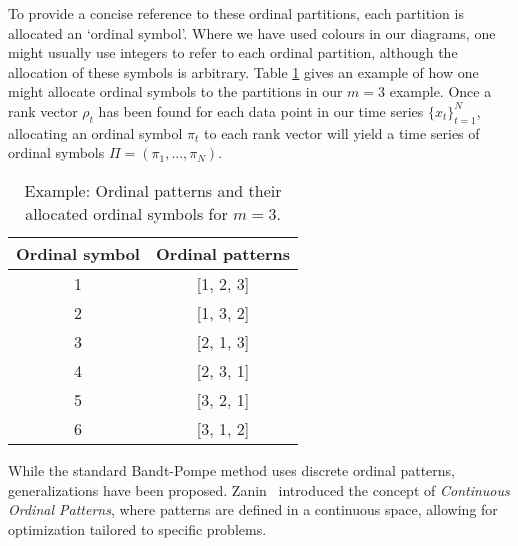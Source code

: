 To provide a concise reference to these ordinal partitions, each partition is allocated an `ordinal symbol'. Where we have used colours in our diagrams, one might usually use integers to refer to each ordinal partition, although the allocation of these symbols is arbitrary. Table \ref{tab:ordinal_symbols} gives an example of how one might allocate ordinal symbols to the partitions in our $m=3$ example. Once a rank vector $\rho_t$ has been found for each data point in our time series $\{x_t\}_{t=1}^N$, allocating an ordinal symbol $\pi_t$ to each rank vector will yield a time series of ordinal symbols $\Pi = (\pi_1,...,\pi_N)$.

\begin{table}[h]
    \centering
    \begin{tabular}{c|c}
        Ordinal symbol & Ordinal patterns \\
        \hline
        \cellcolor{col1}1 & \cellcolor{col1!30}[1, 2, 3] \\
        \cellcolor{col2}2 & \cellcolor{col2!30}[1, 3, 2] \\
        \cellcolor{col3}3 & \cellcolor{col3!30}[2, 1, 3] \\
        \cellcolor{col4}4 & \cellcolor{col4!30}[2, 3, 1] \\
        \cellcolor{col5}5 & \cellcolor{col5!30}[3, 2, 1] \\
        \cellcolor{col6}6 & \cellcolor{col6!30}[3, 1, 2] \\
    \end{tabular}
    \caption{Example: Ordinal patterns and their allocated ordinal symbols for $m=3$.}
    \label{tab:ordinal_symbols}
\end{table}

While the standard Bandt-Pompe method uses discrete ordinal patterns, generalizations have been proposed. Zanin~\cite{zanin_2023} introduced the concept of \emph{Continuous Ordinal Patterns}, where patterns are defined in a continuous space, allowing for optimization tailored to specific problems.

